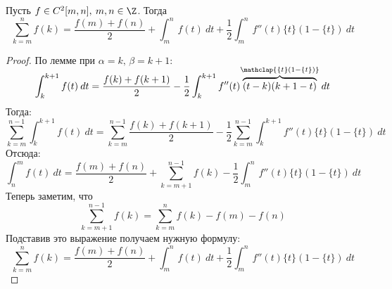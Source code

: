 \begin{theorem}
    Пусть $f \in C^2[m, n], \: m,n \in \Z$. Тогда
    \begin{equation*}
        \sum\limits_{k = m}^{n} f(k) = \frac{f(m) + f(n)}{2} +
        \int_{{m}}^{{n}} {f(t)} \: d{t} + \frac{1}{2}
        \int_{{m}}^{{n}} {f''(t)\{t\}(1 - \{t\})} \: d{t}
    \end{equation*}
\end{theorem}
\begin{proof}
  По лемме при $\alpha = k,\, \beta = k + 1$:
  \begin{equation*}
    \int_{{k}}^{{k + 1}} {f(t)} \: d{t} = \frac{f(k) + f(k + 1)}{2} -
    \frac{1}{2} \int_{{k}}^{{k + 1}} {f''(t)
    \smash{\overbrace{(t - k)(k + 1 - t)}^{\mathclap{\{t\}(1 - \{t\})}}}} \: d{t} {}
  \end{equation*}
  Тогда:
  \begin{equation*}
    \sum_{k = m}^{n - 1} \int_{{k}}^{{k + 1}} {f(t)} \: d{t} =
    \sum_{k = m}^{n - 1} \frac{f(k) + f(k + 1)}{2} -
    \frac{1}{2} \sum_{k = m}^{n - 1} \int_{{k}}^{{k + 1}}
    {f''(t)\{t\}(1 - \{t\})} \: d{t}
  \end{equation*}
  Отсюда:
  \begin{equation*}
    \int_{{n}}^{{m}} {f(t)} \: d{t} = \frac{f(m) + f(n)}{2} +
    \sum_{k = {m + 1}}^{n - 1} f(k) -
    \frac{1}{2} \int_{{m}}^{{n}} {f''(t)\{t\}(1 - \{t\})} \: d{t}
  \end{equation*}
  Теперь заметим, что
  \begin{equation*}
    \sum\limits_{k = m + 1}^{n - 1} f(k)
    = \sum\limits_{k = m}^{n} f(k) - f(m) - f(n)
  \end{equation*}
  Подставив это выражение получаем нужную формулу:
  \begin{equation*}
    \sum\limits_{k = m}^{n} f(k) = \frac{f(m) + f(n)}{2} +
    \int_{{m}}^{{n}} {f(t)} \: d{t} + \frac{1}{2}
    \int_{{m}}^{{n}} {f''(t)\{t\}(1 - \{t\})} \: d{t}
  \end{equation*}
\end{proof}

